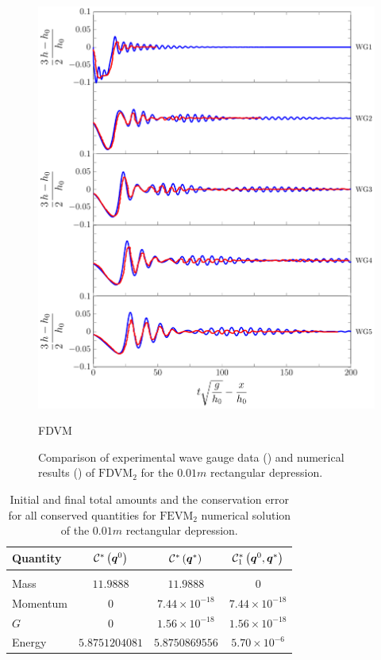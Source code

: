 \begin{figure}
	\centering
	\includegraphics[width=\textwidth]{./chp6/figures/Experiment/Segur/LongWGsFDVM1cm.pdf}
	\caption{FDVM}
	\caption{Comparison of experimental wave gauge data ({\color{red}\solidrule}) and numerical results ({\color{blue}\solidrule}) of $\text{FDVM}_2$ for the $0.01m$ rectangular depression.}
	\label{fig:Segur1cmFDVM}
\end{figure} 
%
\begin{table}
	\centering
	\begin{tabular}{l  c  c c}
		Quantity& $\mathcal{C}^*\left(\boldsymbol{q}^0\right)$ & $\mathcal{C}^*\left(\boldsymbol{q}^*\right)$ & $\mathcal{C}^*_1\left(\boldsymbol{q}^0,\boldsymbol{q}^*\right)$ \\
		\hline &&& \\
		Mass & $11.9888$ & $11.9888$ & $0$\\
		Momentum & $0$ & $7.44 \times 10^{-18}$ & $7.44 \times 10^{-18}$\\
		$G$ & $0$ & $1.56\times 10^{-18}$ & $1.56\times 10^{-18}$\\
		Energy & $5.8751204081$ & $5.8750869556$ & $5.70 \times 10^{-6}$ \\
	\end{tabular}
	\caption{Initial and final total amounts and the conservation error for all conserved quantities for $\text{FEVM}_2$ numerical solution of the $0.01m$ rectangular depression.}
	\label{tab:ConservationSegurFEVM1cm}
\end{table} 
